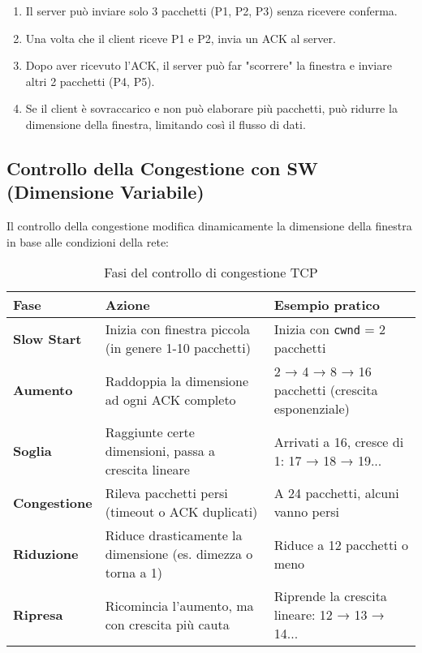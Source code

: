 \begin{enumerate}
    \item Il server può inviare solo 3 pacchetti (P1, P2, P3) senza ricevere conferma.
    \item Una volta che il client riceve P1 e P2, invia un ACK al server.
    \item Dopo aver ricevuto l'ACK, il server può far "scorrere" la finestra e inviare altri 2 pacchetti (P4, P5).
    \item Se il client è sovraccarico e non può elaborare più pacchetti, può ridurre la dimensione della finestra, limitando così il flusso di dati.
\end{enumerate}

\subsection{Controllo della Congestione con SW (Dimensione Variabile)}

Il controllo della congestione modifica dinamicamente la dimensione della finestra in base alle condizioni della rete:

\begin{table}[H]
    \centering
    \begin{tabular}{|p{3cm}|p{5cm}|p{6cm}|}
        \hline
        \rowcolor{bg_custom}
        \textbf{Fase} & \textbf{Azione} & \textbf{Esempio pratico} \\
        \hline
        \textbf{Slow Start} & Inizia con finestra piccola (in genere 1-10 pacchetti) & Inizia con \texttt{cwnd} = 2 pacchetti \\
        \hline
        \textbf{Aumento} & Raddoppia la dimensione ad ogni ACK completo & 2 → 4 → 8 → 16 pacchetti (crescita esponenziale) \\
        \hline
        \textbf{Soglia} & Raggiunte certe dimensioni, passa a crescita lineare & Arrivati a 16, cresce di 1: 17 → 18 → 19... \\
        \hline
        \textbf{Congestione} & Rileva pacchetti persi (timeout o ACK duplicati) & A 24 pacchetti, alcuni vanno persi \\
        \hline
        \textbf{Riduzione} & Riduce drasticamente la dimensione (es. dimezza o torna a 1) & Riduce a 12 pacchetti o meno \\
        \hline
        \textbf{Ripresa} & Ricomincia l'aumento, ma con crescita più cauta & Riprende la crescita lineare: 12 → 13 → 14... \\
        \hline
    \end{tabular}
    \caption{Fasi del controllo di congestione TCP}
\end{table}

